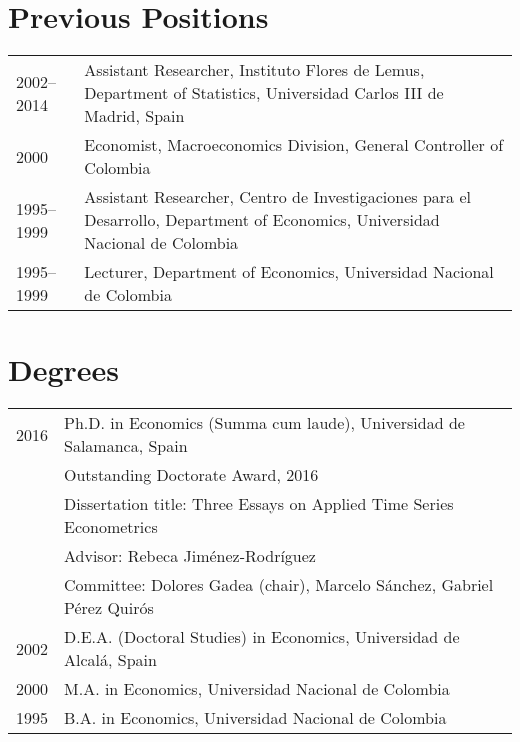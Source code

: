 \documentclass[11pt]{article}\usepackage[]{graphicx}\usepackage[]{color}
\begin{document}

\section{Previous Positions} 

\begin{tabular}{R{2cm} | L{12cm}}

2002--2014 &  Assistant Researcher, Instituto Flores de Lemus, Department of Statistics, Universidad Carlos III de Madrid, Spain \\[.1cm]

2000 & Economist, Macroeconomics Division, General Controller of Colombia \\[.1cm]

1995--1999 & Assistant Researcher, Centro de Investigaciones para el Desarrollo, Department of Economics, Universidad Nacional de Colombia \\[.1cm]

1995--1999 & Lecturer, Department of Economics, Universidad Nacional de Colombia \\

\end{tabular}
\vspace{10pt}

\section{Degrees} 

\begin{tabular}{R{2cm} | L{12cm}}

2016 & Ph.D. in Economics (Summa cum laude), Universidad de Salamanca, Spain\\
& Outstanding Doctorate Award, 2016\\
& Dissertation title: Three Essays on Applied Time Series Econometrics\\
& Advisor: Rebeca Jiménez-Rodríguez\\
& Committee: Dolores Gadea (chair), Marcelo Sánchez, Gabriel Pérez Quirós\\[.3cm]

2002 & D.E.A. (Doctoral Studies) in Economics, Universidad de Alcalá, Spain\\

2000 & M.A. in Economics, Universidad Nacional de Colombia\\

1995 & B.A. in Economics, Universidad Nacional de Colombia\\

\end{tabular}
\vspace{10pt}
\end{document}

